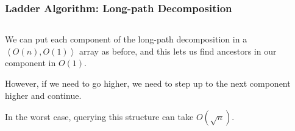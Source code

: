 \documentclass[aspectratio=169]{beamer}
\begin{document}
\begin{frame}
\frametitle{Ladder Algorithm: Long-path Decomposition}

\begin{columns}[onlytextwidth]
  \begin{column}{.58\textwidth}

    We can put each component of the long-path decomposition in a
    $\left<O(n), O(1)\right>$ array as before, and this lets us find
    ancestors in our component in $O(1)$.

    \vspace{1em}
    \pause
    However, if we need to go higher, we need to step up to the next
    component higher and continue.

    \vspace{1em}
    \pause
    In the worst case, querying this structure can take $O(\sqrt n)$.

  \end{column}%
  \hfill%
  \begin{column}{.38\textwidth}


\end{column}
\end{columns}
\end{frame}
\end{document}
